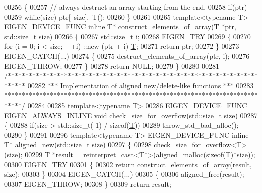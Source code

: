\begin{DoxyCode}
00256 \{
00257   \textcolor{comment}{// always destruct an array starting from the end.}
00258   \textcolor{keywordflow}{if}(ptr)
00259     \textcolor{keywordflow}{while}(size) ptr[--size].~T();
00260 \}
00261 
00265 \textcolor{keyword}{template}<\textcolor{keyword}{typename} T> EIGEN\_DEVICE\_FUNC \textcolor{keyword}{inline} \hyperlink{group___sparse_core___module_class_eigen_1_1_triplet}{T}* construct\_elements\_of\_array(\hyperlink{group___sparse_core___module_class_eigen_1_1_triplet}{T} *ptr, std::size\_t size)
00266 \{
00267   std::size\_t i;
00268   EIGEN\_TRY
00269   \{
00270       \textcolor{keywordflow}{for} (i = 0; i < size; ++i) ::\textcolor{keyword}{new} (ptr + i) \hyperlink{group___sparse_core___module_class_eigen_1_1_triplet}{T};
00271       \textcolor{keywordflow}{return} ptr;
00272   \}
00273   EIGEN\_CATCH(...)
00274   \{
00275     destruct\_elements\_of\_array(ptr, i);
00276     EIGEN\_THROW;
00277   \}
00278   \textcolor{keywordflow}{return} NULL;
00279 \}
00280 
00281 \textcolor{comment}{/*****************************************************************************}
00282 \textcolor{comment}{*** Implementation of aligned new/delete-like functions                    ***}
00283 \textcolor{comment}{*****************************************************************************/}
00284 
00285 \textcolor{keyword}{template}<\textcolor{keyword}{typename} T>
00286 EIGEN\_DEVICE\_FUNC EIGEN\_ALWAYS\_INLINE \textcolor{keywordtype}{void} check\_size\_for\_overflow(std::size\_t size)
00287 \{
00288   \textcolor{keywordflow}{if}(size > std::size\_t(-1) / \textcolor{keyword}{sizeof}(\hyperlink{group___sparse_core___module_class_eigen_1_1_triplet}{T}))
00289     throw\_std\_bad\_alloc();
00290 \}
00291 
00296 \textcolor{keyword}{template}<\textcolor{keyword}{typename} T> EIGEN\_DEVICE\_FUNC \textcolor{keyword}{inline} \hyperlink{group___sparse_core___module_class_eigen_1_1_triplet}{T}* aligned\_new(std::size\_t size)
00297 \{
00298   check\_size\_for\_overflow<T>(size);
00299   \hyperlink{group___sparse_core___module_class_eigen_1_1_triplet}{T} *result = \textcolor{keyword}{reinterpret\_cast<}\hyperlink{group___sparse_core___module_class_eigen_1_1_triplet}{T}*\textcolor{keyword}{>}(aligned\_malloc(\textcolor{keyword}{sizeof}(\hyperlink{group___sparse_core___module_class_eigen_1_1_triplet}{T})*size));
00300   EIGEN\_TRY
00301   \{
00302     \textcolor{keywordflow}{return} construct\_elements\_of\_array(result, size);
00303   \}
00304   EIGEN\_CATCH(...)
00305   \{
00306     aligned\_free(result);
00307     EIGEN\_THROW;
00308   \}
00309   \textcolor{keywordflow}{return} result;

\end{DoxyCode}
